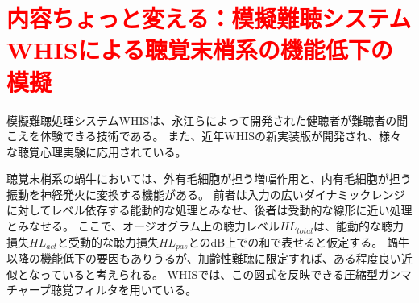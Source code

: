 \section{\textcolor{red}{内容ちょっと変える：模擬難聴システムWHISによる聴覚末梢系の機能低下の模擬}}
\label{sec:WHIS}

模擬難聴処理システムWHISは、永江らによって開発された健聴者が難聴者の聞こえを体験できる技術である\cite{nagae2016WHIS}。
また、近年WHISの新実装版が開発され\cite{irino2023hearing}、様々な聴覚心理実験に応用されている。


聴覚末梢系の蝸牛においては、外有毛細胞が担う増幅作用と、内有毛細胞が担う振動を神経発火に変換する機能がある。
前者は入力の広いダイナミックレンジに対してレベル依存する能動的な処理とみなせ、後者は受動的な線形に近い処理とみなせる。
ここで、オージオグラム上の聴力レベル$HL_{total}$は、能動的な聴力損失$HL_{act}$と受動的な聴力損失$HL_{pas}$とのdB上での和で表せると仮定する\cite{moore1997model}。
蝸牛以降の機能低下の要因もありうるが、加齢性難聴に限定すれば、ある程度良い近似となっていると考えられる。
WHISでは、この図式を反映できる圧縮型ガンマチャープ聴覚フィルタ\cite{irino2001compressive,irino2006dynamic}を用いている。


